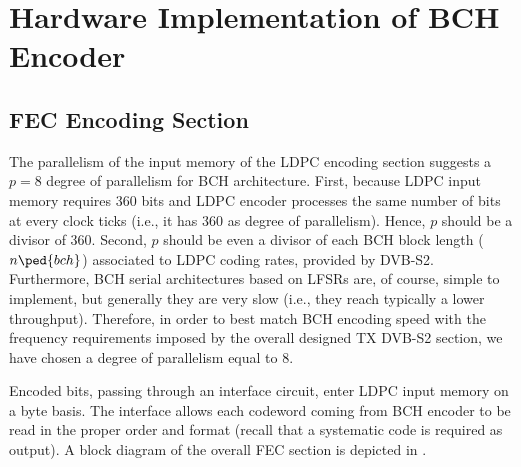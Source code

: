 

\chapter{Hardware Implementation of BCH Encoder} \label{ch:BCHencImpl}


\section{FEC Encoding Section}

The parallelism of the input memory of the LDPC encoding section suggests a \(p = 8\) degree of parallelism for BCH architecture. First, because LDPC input memory requires 360 bits and LDPC encoder processes the same number of bits at every clock ticks (i.e., it has 360 as degree of parallelism). Hence, \(p\) should be a divisor of 360.
Second, \(p\) should be even a divisor of each BCH block length (\(n\ped{bch}\)) associated to LDPC coding rates, provided by DVB-S2.
Furthermore, BCH serial architectures based on LFSRs are, of course, simple to implement, but generally they are very slow (i.e., they reach typically a lower throughput). Therefore, in order to best match BCH encoding speed with the frequency requirements imposed by the overall designed TX DVB-S2 section, we have chosen a degree of parallelism equal to 8.

Encoded bits, passing through an interface circuit, enter LDPC input memory on a byte basis. The interface allows each codeword coming from BCH encoder to be read in the proper order and format (recall that a systematic code is required as output). A block diagram of the overall FEC section is depicted in .


